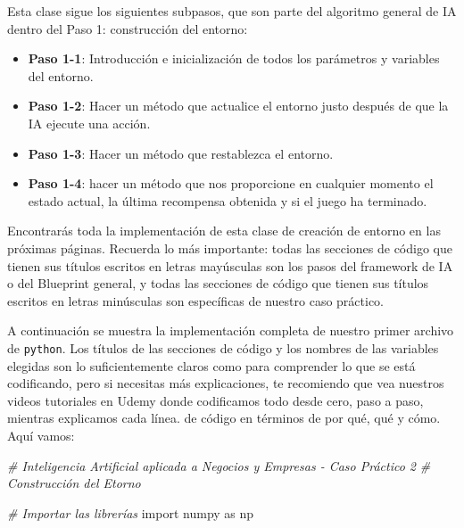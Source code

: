 \documentclass[
]{book}
\newenvironment{Shaded}{\begin{snugshade}}{\end{snugshade}}
\newcommand{\CommentTok}[1]{\textcolor[rgb]{0.56,0.35,0.01}{\textit{#1}}}
\newcommand{\ImportTok}[1]{#1}
\newcommand{\NormalTok}[1]{#1}
\providecommand{\tightlist}{%
  \setlength{\itemsep}{0pt}\setlength{\parskip}{0pt}}
\begin{document}
Esta clase sigue los siguientes subpasos, que son parte del algoritmo general de IA dentro del Paso 1: construcción del entorno:

\begin{itemize}
\tightlist
\item
  \textbf{Paso 1-1}: Introducción e inicialización de todos los parámetros y variables del entorno.
\item
  \textbf{Paso 1-2}: Hacer un método que actualice el entorno justo después de que la IA ejecute una acción.
\item
  \textbf{Paso 1-3}: Hacer un método que restablezca el entorno.
\item
  \textbf{Paso 1-4}: hacer un método que nos proporcione en cualquier momento el estado actual, la última recompensa obtenida y si el juego ha terminado.
\end{itemize}

Encontrarás toda la implementación de esta clase de creación de entorno en las próximas páginas. Recuerda lo más importante: todas las secciones de código que tienen sus títulos escritos en letras mayúsculas son los pasos del framework de IA o del Blueprint general, y todas las secciones de código que tienen sus títulos escritos en letras minúsculas son específicas de nuestro caso práctico.

A continuación se muestra la implementación completa de nuestro primer archivo de \texttt{python}. Los títulos de las secciones de código y los nombres de las variables elegidas son lo suficientemente claros como para comprender lo que se está codificando, pero si necesitas más explicaciones, te recomiendo que vea nuestros videos tutoriales en Udemy donde codificamos todo desde cero, paso a paso, mientras explicamos cada línea. de código en términos de por qué, qué y cómo. Aquí vamos:

\begin{Shaded}
\begin{Highlighting}[]
\CommentTok{\# Inteligencia Artificial aplicada a Negocios y Empresas {-} Caso Práctico 2}
\CommentTok{\# Construcción del Etorno}

\CommentTok{\# Importar las librerías}
\ImportTok{import}\NormalTok{ numpy }\ImportTok{as}\NormalTok{ np}
\end{Highlighting}
\end{Shaded}
\end{document}
